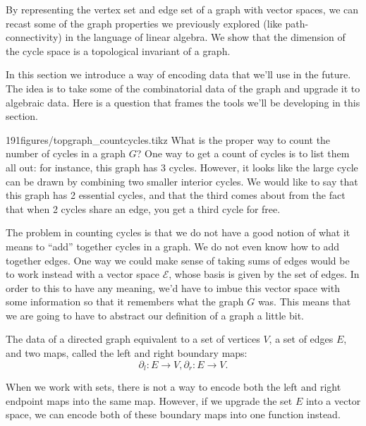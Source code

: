\begin{elevator}
By representing the vertex set and edge set of a graph with vector spaces, we can recast some of the graph properties we previously explored (like path-connectivity) in the language of linear algebra. 
We show that the dimension of the cycle space is a topological invariant of a graph.
\end{elevator}
\label{sec:graph:cyclespace}
In this section we introduce a way of encoding data that we'll use in the future. The idea is to take some of the combinatorial data of the graph and upgrade it to algebraic data. Here is a question that frames the tools we'll be developing in this section. 
\begin{examplefigureenv}{191figures/topgraph_countcycles.tikz}
	\label{fig:cyclecount}
What is the proper way to count the number of cycles in a graph $G$?
One way to get a count of cycles is to list them all out: for instance, this graph has 3 cycles. However, it looks like the large cycle can be drawn by combining  two smaller interior cycles. We would like to say that  this graph  has 2 essential cycles, and that the third comes about from the fact that when 2 cycles share an edge, you get a third cycle for free. 
\end{examplefigureenv}

The problem in counting cycles is that we do not have a good notion of what it means to ``add'' together cycles in a graph.
We do not even know how to add together edges.
One way we could make sense of taking sums of edges would be to work instead with a vector space $\mathcal E$, whose basis is given by the set of edges.
In order to this to have any meaning, we'd have to imbue this vector space with some information so that it remembers what the graph $G$ was. This means that we are going to have to abstract our definition of a graph a little bit.
\begin{claim}
The data of a directed graph equivalent to a set of vertices $V$, a set of edges $E$, and two maps, called the left and right boundary maps: \[\partial_l : E\to V, \partial_r: E\to V.\]
\end{claim} 
When we work with sets, there is not a way to encode both the left and right endpoint maps into the same map. However, if we upgrade the set $E$ into a vector space, we can encode both of these boundary maps into one function instead. 
